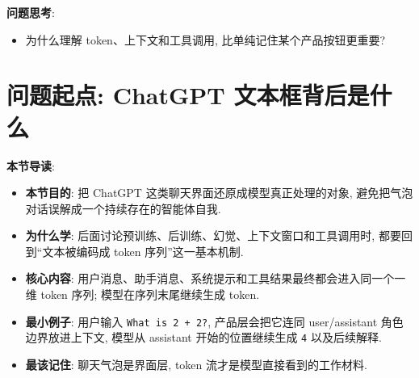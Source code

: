 \documentclass{../nndlcourse}
\begin{document}
\textbf{问题思考}:
\begin{itemize}
  \item 为什么理解 token、上下文和工具调用, 比单纯记住某个产品按钮更重要?
\end{itemize}

\section{问题起点: ChatGPT 文本框背后是什么}

\textbf{本节导读}:
\begin{itemize}
  \item \textbf{本节目的}: 把 ChatGPT 这类聊天界面还原成模型真正处理的对象, 避免把气泡对话误解成一个持续存在的智能体自我.
  \item \textbf{为什么学}: 后面讨论预训练、后训练、幻觉、上下文窗口和工具调用时, 都要回到“文本被编码成 token 序列”这一基本机制.
  \item \textbf{核心内容}: 用户消息、助手消息、系统提示和工具结果最终都会进入同一个一维 token 序列; 模型在序列末尾继续生成 token.
  \item \textbf{最小例子}: 用户输入 \texttt{What is 2 + 2?}, 产品层会把它连同 user/assistant 角色边界放进上下文, 模型从 assistant 开始的位置继续生成 \texttt{4} 以及后续解释.
  \item \textbf{最该记住}: 聊天气泡是界面层, token 流才是模型直接看到的工作材料.
\end{itemize}
\end{document}
